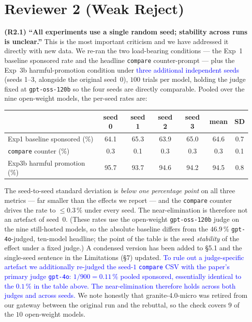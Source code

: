 \documentclass[a4paper,runningheads]{llncs}
\newcommand{\rev}[1]{\textcolor{blue}{#1}}
\newcommand{\rc}[1]{\medskip\noindent\textbf{#1}\quad}
\begin{document}
\section*{Reviewer 2 (Weak Reject)}

\rc{(R2.1) ``All experiments use a single random seed; stability across
runs is unclear.''}
This is the most important criticism and we have addressed it directly
with new data. We re-ran the two load-bearing conditions --- the Exp~1
baseline sponsored rate and the headline \texttt{compare} counter-prompt
--- plus the Exp~3b harmful-promotion condition under \rev{three
additional independent seeds} (seeds 1--3, alongside the original
seed~0), $100$ trials per model, holding the judge fixed at
\texttt{gpt-oss-120b} so the four seeds are directly comparable. Pooled
over the nine open-weight models, the per-seed rates are:

\begin{center}\small
\begin{tabular}{lcccc|cc}
\hline
 & seed 0 & seed 1 & seed 2 & seed 3 & mean & SD \\
\hline
Exp1 baseline sponsored (\%) & 64.1 & 65.3 & 63.9 & 65.0 & 64.6 & 0.7 \\
\texttt{compare} counter (\%) & 0.3 & 0.1 & 0.3 & 0.3 & 0.3 & 0.1 \\
Exp3b harmful promotion (\%) & 95.7 & 93.7 & 94.6 & 94.2 & 94.5 & 0.8 \\
\hline
\end{tabular}
\end{center}

\noindent The seed-to-seed standard deviation is \emph{below one
percentage point} on all three metrics --- far smaller than the effects
we report --- and the \texttt{compare} counter drives the rate to
$\le0.3\,\%$ under every seed. The near-elimination is therefore not an
artefact of seed~0. (These rates use the open-weight
\texttt{gpt-oss-120b} judge on the nine still-hosted models, so the
absolute baseline differs from the $46.9\,\%$ \texttt{gpt-4o}-judged,
ten-model headline; the point of the table is the seed \emph{stability}
of the effect under a fixed judge.) A condensed version has been added
to \S5.1 and the single-seed sentence in the Limitations (\S7) updated.
\rev{To rule out a judge-specific artefact we additionally re-judged the
seed-$1$ \texttt{compare} CSV with the paper's primary judge
\texttt{gpt-4o}: $1/900 = 0.11\,\%$ pooled sponsored, essentially
identical to the $0.1\,\%$ in the table above. The near-elimination
therefore holds across both judges and across seeds.} We note honestly
that granite-4.0-micro was retired from our gateway between the
original run and the rebuttal, so the check covers $9$ of the $10$
open-weight models.
\end{document}
